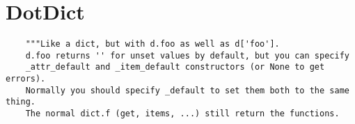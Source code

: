 
















\section{DotDict}
\begin{verbatim}
    """Like a dict, but with d.foo as well as d['foo'].
    d.foo returns '' for unset values by default, but you can specify
    _attr_default and _item_default constructors (or None to get errors).
    Normally you should specify _default to set them both to the same thing.
    The normal dict.f (get, items, ...) still return the functions.
\end{verbatim}



